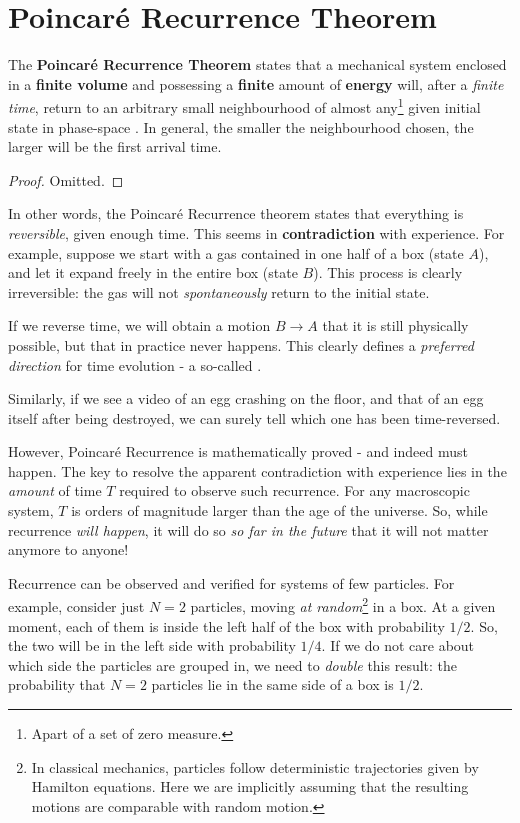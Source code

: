 \documentclass[../../main.tex]{subfiles}
\begin{document}
\section{Poincaré Recurrence Theorem}
The \textbf{Poincaré Recurrence Theorem} states that a mechanical system enclosed in a \textbf{finite volume} and possessing a \textbf{finite} amount of \textbf{energy} will, after a \textit{finite time}, return to an arbitrary small neighbourhood of almost any\footnote{Apart of a set of zero measure.} given initial state in phase-space \cite[Chapter~1.7]{mathsm}. In general, the smaller the neighbourhood chosen, the larger will be the first arrival time.

\begin{proof}
    Omitted.
\end{proof}

In other words, the Poincaré Recurrence theorem states that everything is \textit{reversible}, given enough time.  
This seems in \textbf{contradiction}  with experience. For example, suppose we start with a gas contained in one half of a box (state $A$), and let it expand freely in the entire box (state $B$). This process is clearly irreversible: the gas will not \textit{spontaneously} return to the initial state. 

If we reverse time, we will obtain a motion $B \to A$ that it is still physically possible, but that in practice never happens. This clearly defines a \textit{preferred direction} for time evolution - a so-called . 

Similarly, if we see a video of an egg crashing on the floor, and that of an egg  itself after being destroyed, we can surely tell which one has been time-reversed. 

\medskip

However, Poincaré Recurrence is mathematically proved - and indeed must happen. The key to resolve the apparent contradiction with experience lies in the \textit{amount} of time $T$ required to observe such recurrence. For any macroscopic system, $T$ is orders of magnitude larger than the age of the universe. So, while recurrence \textit{will happen}, it will do so \textit{so far in the future} that it will not matter anymore to anyone!

\medskip

Recurrence can be observed and verified for systems of few particles. For example, consider just $N=2$ particles, moving \textit{at random}\footnote{In classical mechanics, particles follow deterministic trajectories given by Hamilton equations. Here we are implicitly assuming that the resulting motions are comparable with random motion.} in a box. At a given moment, each of them is inside the left half of the box with probability $1/2$. So, the two will be in the left side with probability $1/4$. If we do not care about which side the particles are grouped in, we need to \textit{double} this result: the probability that $N=2$ particles lie in the same side of a box is $1/2$.
\end{document}
